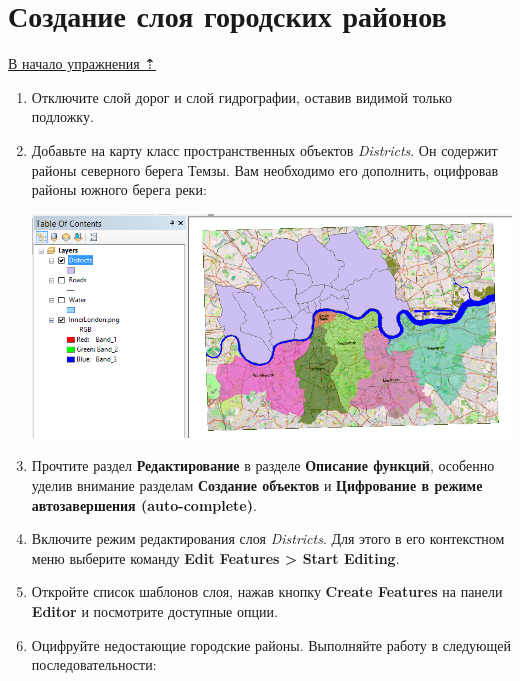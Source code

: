 \documentclass[]{book}
\theoremstyle{definition}
\theoremstyle{definition}
\theoremstyle{definition}
\theoremstyle{remark}
\begin{document}
\hypertarget{map-ref-economic-regions}{%
\section{Создание слоя городских
районов}\label{map-ref-economic-regions}}

\protect\hyperlink{map-ref-economic}{В начало упражнения ⇡}

\begin{enumerate}
\def\labelenumi{\arabic{enumi}.}
\item
  Отключите слой дорог и слой гидрографии, оставив видимой только
  подложку.
\item
  Добавьте на карту класс пространственных объектов \emph{Districts}. Он
  содержит районы северного берега Темзы. Вам необходимо его дополнить,
  оцифровав районы южного берега реки:

  \includegraphics{images/Ex07/image12.png}
\item
  Прочтите раздел \textbf{Редактирование} в разделе \textbf{Описание
  функций}, особенно уделив внимание разделам \textbf{Создание объектов}
  и \textbf{Цифрование в режиме автозавершения (auto-complete)}.
\item
  Включите режим редактирования слоя \emph{Districts}. Для этого в его
  контекстном меню выберите команду \textbf{Edit Features \textgreater{}
  Start Editing}.
\item
  Откройте список шаблонов слоя, нажав кнопку \textbf{Create Features}
  на панели \textbf{Editor} и посмотрите доступные опции.
\item
  Оцифруйте недостающие городские районы. Выполняйте работу в следующей
  последовательности:


\end{enumerate}
\end{document}
